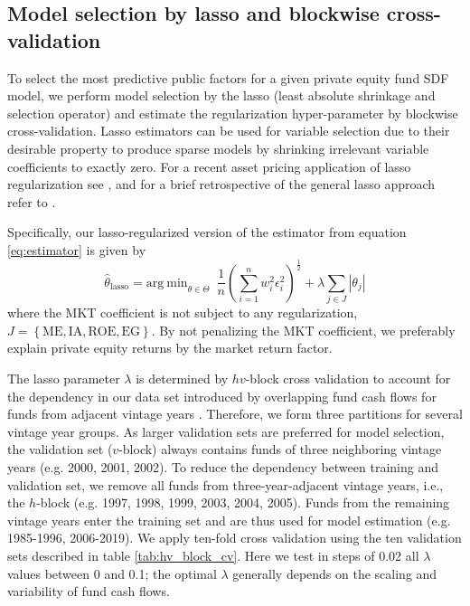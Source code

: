 \documentclass[12pt]{article}
\begin{document}
\subsection{Model selection by lasso and blockwise cross-validation}
\label{sec:model_selection}

To select the most predictive public factors for a given private equity fund SDF model, we perform model selection by the lasso (least absolute shrinkage and selection operator) and estimate the regularization hyper-parameter by blockwise cross-validation.
Lasso estimators can be used for variable selection due to their desirable property to produce sparse models by shrinking irrelevant variable coefficients to exactly zero.
For a recent asset pricing application of lasso regularization see \cite{FGX20}, and for a brief retrospective of the general lasso approach refer to \cite{T11}.

Specifically, our lasso-regularized version of the estimator from equation \ref{eq:estimator} is given by
\begin{equation}
\label{eq:lasso_estimator}
\hat{\theta}_{\mathrm{lasso}} = 
\mathrm{arg \ min}_{\theta \in \Theta}
\enspace
\frac{1}{n}
\left(
\sum_{i=1}^n
w_{i}^2 \epsilon_{i}^2
\right)^{\frac{1}{2}}
+ \lambda \sum_{j \in J} \left| \theta_j \right|
\end{equation}
where the MKT coefficient is not subject to any regularization, $J = \left\{\mathrm{ME}, \mathrm{IA}, \mathrm{ROE}, \mathrm{EG}\right\}$.
By not penalizing the MKT coefficient, we preferably explain private equity returns by the market return factor.

The lasso parameter $\lambda$ is determined by $hv$-block cross validation to account for the dependency in our data set introduced by overlapping fund cash flows for funds from adjacent vintage years \citep{R00}. 
Therefore, we form three partitions for several vintage year groups. 
As larger validation sets are preferred for model selection, the validation set ($v$-block) always contains funds of three neighboring vintage years (e.g. 2000, 2001, 2002). 
To reduce the dependency between training and validation set, we remove all funds from three-year-adjacent vintage years, i.e., the $h$-block (e.g. 1997, 1998, 1999, 2003, 2004, 2005). 
Funds from the remaining vintage years enter the training set and are thus used for model estimation (e.g. 1985-1996, 2006-2019).
We apply ten-fold cross validation using the ten validation sets described in table \ref{tab:hv_block_cv}. Here we test in steps of 0.02 all $\lambda$ values between 0 and 0.1; the optimal $\lambda$ generally depends on the scaling and variability of fund cash flows.
\end{document}
